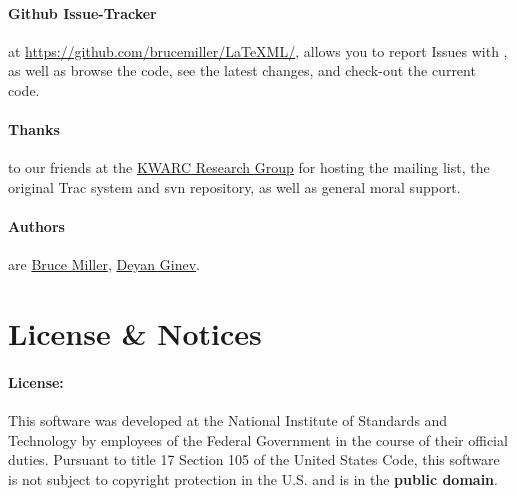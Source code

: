 \documentclass{article}
\begin{document}
\paragraph{Github Issue-Tracker}\label{contact.git}
at \href{https://github.com/brucemiller/LaTeXML/}{https://github.com/brucemiller/LaTeXML/},
allows you to report Issues with \LaTeXML,
as well as browse the code, see the latest changes, and check-out the current code.



\paragraph{Thanks} to our friends at
the \href{https://kwarc.info}{KWARC Research Group}
for hosting the mailing list, the original Trac system and svn repository,
as well as general moral support.

\paragraph{Authors} are
\href{mailto:bruce.miller@nist.gov}{Bruce Miller},
\href{mailto:deyan.ginev@gmail.com}{Deyan Ginev}.
\section{License \& Notices}\label{notices}

\paragraph{License:}
  This software was developed at the National Institute of Standards and
Technology by employees of the Federal Government in the course of their
official duties. Pursuant to title 17 Section 105 of the United States
Code, this software is not subject to copyright protection in the U.S.
and is in the \textbf{public domain}.
\end{document}
